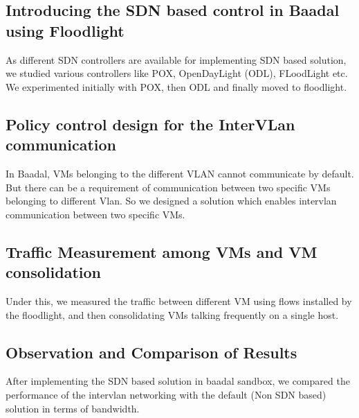 \subsection{Introducing the SDN based control in Baadal using Floodlight}
As different SDN controllers are available for implementing SDN based solution, we studied various controllers like POX, OpenDayLight (ODL), FLoodLight etc. We experimented initially with POX, then ODL and finally moved to floodlight.
\subsection{Policy control design for the InterVLan communication}
In Baadal, VMs belonging to the different VLAN cannot communicate by default. But there can be a requirement of communication between two specific VMs belonging to different Vlan. So we designed a solution which enables intervlan communication between two specific VMs.

\subsection{Traffic Measurement among VMs and VM consolidation}
Under this, we measured the traffic between different VM using flows installed by the floodlight, and then consolidating VMs talking frequently on a single host.

\subsection{Observation and Comparison of Results}
After implementing the SDN based solution in baadal sandbox, we compared the performance of the intervlan networking with the default (Non SDN based) solution in terms of bandwidth.  




